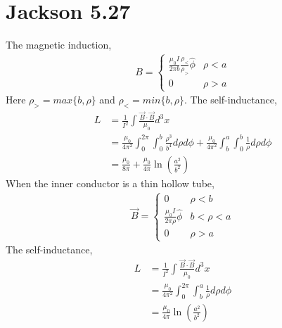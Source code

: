 \documentclass{article}
\begin{document}
\section*{Jackson 5.27}
The magnetic induction,
\begin{align*}
B=\left\{\begin{array}{cc}
\frac{\mu_0I}{2\pi b}\frac{\rho_<}{\rho_>}\hat\phi & \rho<a\\
0 & \rho > a
\end{array}\right.
\end{align*}
Here $\rho_>=max\{b,\rho\}$ and $\rho_<=min\{b,\rho\}$. The self-inductance,
\begin{align*}
  L&=\frac{1}{I^2}\int\frac{\vec B\cdot\vec B}{\mu_0}d^3x\\
   &=\frac{\mu_0}{4\pi^2}\int_0^{2\pi}\int_0^b\frac{\rho^3}{b^4}d\rho d\phi+\frac{\mu_0}{4\pi^2}\int_b^a\int_0^b\frac{1}{\rho}d\rho d\phi\\
   &=\frac{\mu_0}{8\pi}+\frac{\mu_0}{4\pi}\ln(\frac{a^2}{b^2})
\end{align*}
When the inner conductor is a thin hollow tube,
\begin{align*}
  \vec B=\left\{
  \begin{array}{cc}
    0 & \rho<b\\
    \frac{\mu_0I}{2\pi \rho}\hat\phi & b<\rho<a\\
    0 & \rho>a
  \end{array}
  \right.
\end{align*}
The self-inductance,
\begin{align*}
  L&=\frac{1}{I^2}\int\frac{\vec B\cdot\vec B}{\mu_0}d^3x\\
   &=\frac{\mu_0}{4\pi^2}\int_0^{2\pi}\int_b^a\frac{1}{\rho}d\rho d\phi\\
   &=\frac{\mu_0}{4\pi}\ln(\frac{a^2}{b^2})
\end{align*}
% 
% 
\end{document}
